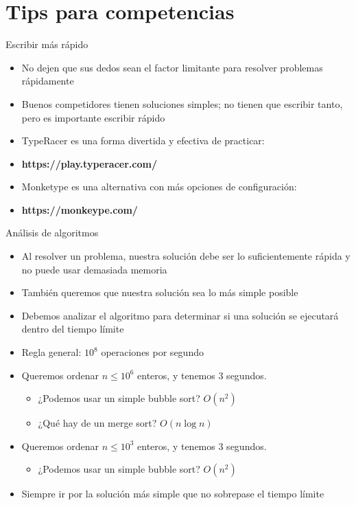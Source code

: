 \documentclass[10pt]{beamer}
\newcommand{\bi}{\begin{itemize}}
\newcommand{\ei}{\end{itemize}}
\begin{document}
\section{Tips para competencias}

\begin{frame}{Escribir más rápido}
    \bi
        \item No dejen que sus dedos sean el factor limitante para resolver problemas rápidamente
        \item Buenos competidores tienen soluciones simples; no tienen que escribir tanto, pero es importante escribir rápido
        \vspace{20pt}
        \item TypeRacer es una forma divertida y efectiva de practicar:
        \item \textbf{https://play.typeracer.com/}
        \vspace{20pt}
        \item Monketype es una alternativa con más opciones de configuración:
        \item \textbf{https://monkeype.com/}
    \ei
\end{frame}

\begin{frame}{Análisis de algoritmos}
    \bi
        \item Al resolver un problema, nuestra solución debe ser lo suficientemente rápida y no puede usar demasiada memoria
        \item También queremos que nuestra solución sea lo más simple posible
        \vspace{5pt}
        \item Debemos analizar el algoritmo para determinar si una solución se ejecutará dentro del tiempo límite
        \item Regla general: $10^{8}$ operaciones por segundo
        \vspace{10pt}
        \item<2-> Queremos ordenar $n \leq 10^{6}$ enteros, y tenemos 3 segundos.
            \bi
                \item ¿Podemos usar un simple bubble sort? $O(n^2)$
                \item ¿Qué hay de un merge sort? $O(n\log n)$
            \ei
        \vspace{5pt}
        \item<3-> Queremos ordenar $n \leq 10^{3}$ enteros, y tenemos 3 segundos.
            \bi
                \item ¿Podemos usar un simple bubble sort? $O(n^2)$
            \ei
        \vspace{5pt}
        \item<4-> Siempre ir por la solución más simple que no sobrepase el tiempo límite
    \ei
\end{frame}
\end{document}
